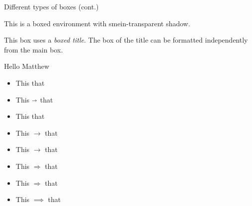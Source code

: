\documentclass{beamer}
\begin{document}
\begin{frame}{Different types of boxes (cont.)}
\begin{shadowblock}
 This is a boxed environment with smein-transparent shadow.
\end{shadowblock}

\begin{tcolorbox}[enhanced,attach boxed title to top center={yshift=-3mm,yshifttext=-1mm},
  colback=blue!5!white,colframe=blue!75!black,colbacktitle=red!80!black,
  title=New title,fonttitle=\bfseries,
  boxed title style={size=small,colframe=red!50!black} ]
  This box uses a \textit{boxed title}. The box of the title can be formatted independently from the main box.
\end{tcolorbox}

\begin{tcolorbox}[enhanced,fit to height=5cm,
  colback=green!25!black!10!white,colframe=green!75!black,title=Fit box (5cm),
  drop fuzzy shadow,watermark color=white,watermark text=watermark test]
    Hello Matthew
\end{tcolorbox}
\end{frame}


\begin{frame}
        \begin{itemize}
            \item This \MVRightarrow{} that
            \item This $\shortrightarrow$ that
            \item This \textrightarrow{} that
            \item This $\rightarrow$ that
            \item This $\longrightarrow$ that
        \end{itemize}
        
        \begin{itemize}
    \item This $\Rightarrow$ that
    \item This $\Longrightarrow$ that
    \item This $\implies$ that
\end{itemize}
    \end{frame}
    
\end{document}
